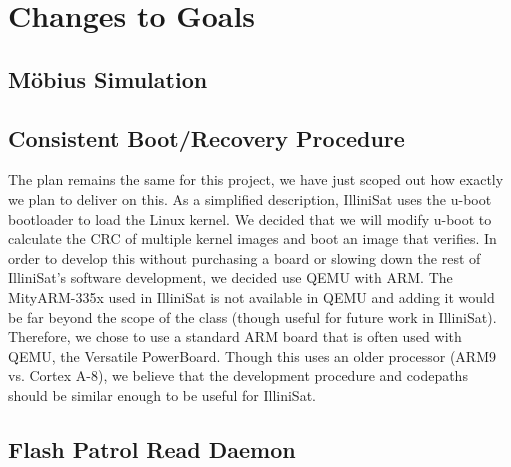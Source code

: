 \section{Changes to Goals} 

\subsection{M\"obius Simulation}


\subsection{Consistent Boot/Recovery Procedure}
The plan remains the same for this project, we have just scoped out how exactly
we plan to deliver on this. As a simplified description, IlliniSat uses the
u-boot bootloader to load the Linux kernel.  We decided that we will modify
u-boot to calculate the CRC of multiple kernel images and boot an image that
verifies.  In order to develop this without purchasing a board or slowing down
the rest of IlliniSat's software development, we decided use QEMU with ARM. The
MityARM-335x used in IlliniSat is not available in QEMU and adding it would be
far beyond the scope of the class (though useful for future work in IlliniSat).
Therefore, we chose to use a standard ARM board that is often used with QEMU,
the Versatile PowerBoard.  Though this uses an older processor (ARM9 vs. Cortex
A-8), we believe that the development procedure and codepaths should be similar
enough to be useful for IlliniSat.


\subsection{Flash Patrol Read Daemon}

